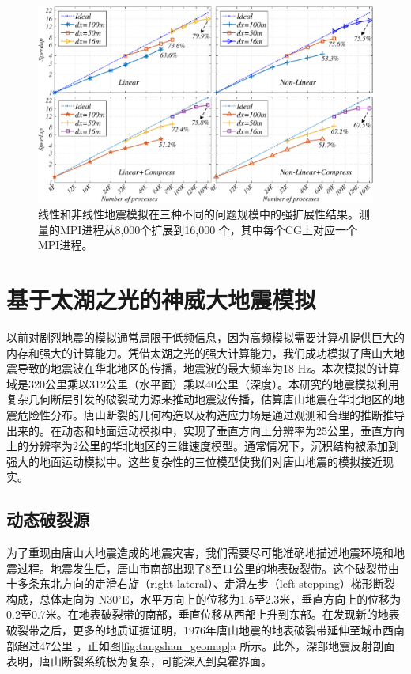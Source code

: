 \documentclass[degree=doctor]{thuthesis}
\begin{document}
\begin{figure}[ht]
\centering
\includegraphics[width=1.0\columnwidth]{strong_scaling.pdf}
\caption{线性和非线性地震模拟在三种不同的问题规模中的强扩展性结果。测量的MPI进程从8,000个扩展到16,000 个，其中每个CG上对应一个MPI进程。}
\label{fig:strong-scaling}
\end{figure}

\section{基于太湖之光的神威大地震模拟}

以前对剧烈地震的模拟通常局限于低频信息，因为高频模拟需要计算机提供巨大的内存和强大的计算能力。凭借太湖之光的强大计算能力，我们成功模拟了唐山大地震导致的地震波在华北地区的传播，地震波的最大频率为18 Hz。本次模拟的计算域是320公里乘以312公里（水平面）乘以40公里（深度）。本研究的地震模拟利用复杂几何断层引发的破裂动力源来推动地震波传播，估算唐山地震在华北地区的地震危险性分布。唐山断裂的几何构造以及构造应力场是通过观测和合理的推断推导出来的。在动态和地面运动模拟中，实现了垂直方向上分辨率为25公里，垂直方向上的分辨率为2公里的华北地区的三维速度模型。通常情况下，沉积结构被添加到强大的地面运动模拟中。这些复杂性的三位模型使我们对唐山地震的模拟接近现实。

\subsection{动态破裂源}

为了重现由唐山大地震造成的地震灾害，我们需要尽可能准确地描述地震环境和地震过程。地震发生后，唐山市南部出现了8至11公里的地表破裂带。这个破裂带由十多条东北方向的走滑右旋（right-lateral）、走滑左步（left-stepping）梯形断裂构成，总体走向为 N30$^\circ$E，水平方向上的位移为1.5至2.3米，垂直方向上的位移为0.2至0.7米。在地表破裂带的南部，垂直位移从西部上升到东部。在发现新的地表破裂带\citep {Qiu_discovery_2005}之后，更多的地质证据证明，1976年唐山地震的地表破裂带延伸至城市西南部超过47公里 \citep{guo_new_2011}，正如图\ref{fig:tangshan_geomap}a 所示。此外，深部地震反射剖面表明，唐山断裂系统极为复杂，可能深入到莫霍界面\citep{liu_seismogenic_2007}。
\end{document}

